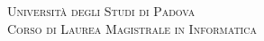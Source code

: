 \documentclass[12pt, a4paper,titlepage]{article}
\begin{document}
\begin{titlepage}

\newcommand{\HRule}{\rule{\linewidth}{0.5mm}} %

\center %


\vspace*{\fill}
\textsc{\Large Università degli Studi di Padova}\\[0.5cm] %
\textsc{\large Corso di Laurea Magistrale in Informatica}\\[0.5cm] %



\end{titlepage}
\end{document}
